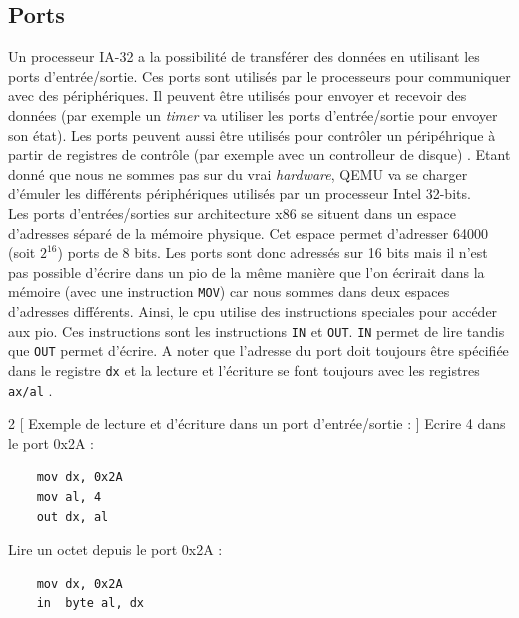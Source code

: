 \label{peripherals}

\subsection{Ports}
Un processeur \acrshort{IA-32} a la possibilité de transférer des données en utilisant
les ports d'entrée/sortie. Ces ports sont utilisés par le processeurs pour communiquer
avec des périphériques. Il peuvent être utilisés pour envoyer et recevoir des données
(par exemple un \textit{timer} va utiliser les ports d'entrée/sortie pour envoyer
son état). Les ports peuvent aussi être utilisés pour contrôler un péripéhrique
à partir de registres de contrôle (par exemple avec un controlleur de disque) \cite{ref64}.
Etant donné que nous ne sommes pas sur du vrai \textit{hardware}, QEMU va se charger
d'émuler les différents périphériques utilisés par un processeur Intel 32-bits. \\

Les ports d'entrées/sorties sur architecture x86 se situent dans un espace d'adresses
séparé de la mémoire physique. Cet espace permet d'adresser 64000 (soit $2^{16}$)
ports de 8 bits. Les ports sont donc adressés sur 16 bits mais  il n'est pas possible
d'écrire dans un \acrshort{pio} de la même manière que l'on écrirait dans la mémoire
(avec une instruction  \texttt{MOV}) car nous sommes dans deux
espaces d'adresses différents. Ainsi, le \acrshort{cpu} utilise des instructions speciales
pour accéder aux \acrshort{pio}. Ces instructions sont les instructions
\texttt{IN} et \texttt{OUT}. \texttt{IN} permet de lire
tandis que \texttt{OUT} permet d'écrire. A noter que l'adresse du port
doit toujours être spécifiée dans le registre \texttt{dx} et la lecture
et l'écriture se font toujours avec les registres \texttt{ax/al} \cite{ref42}. \\

\begin{multicols}{2}
    [
    Exemple de lecture et d'écriture dans un port d'entrée/sortie :
    ]
    Ecrire 4 dans le port 0x2A :
    \begin{verbatim}
    mov dx, 0x2A
    mov al, 4
    out dx, al
    \end{verbatim}
    \columnbreak
    Lire un octet depuis le port 0x2A :
    \begin{verbatim}
    mov dx, 0x2A
    in  byte al, dx
    \end{verbatim}
\end{multicols}

